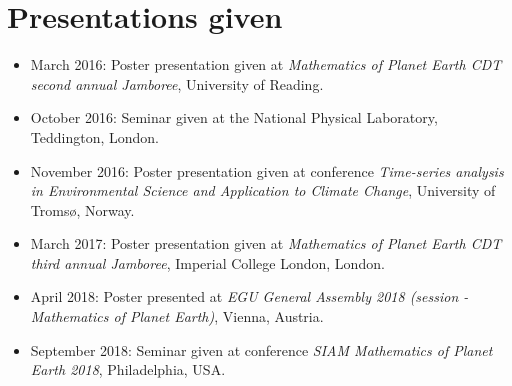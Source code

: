 \documentclass[a4paper,12pt,times,custombib, print]{PhDThesisPSnPDF}
\begin{document}
\chapter*{\centering \Large  Presentations given}
\begin{itemize}
	\item March 2016: Poster presentation given at \emph{Mathematics of Planet Earth CDT second annual Jamboree}, University of Reading.
	\item October 2016: Seminar given at the National Physical Laboratory, Teddington, London.
	\item November 2016: Poster presentation given at conference \emph{Time-series analysis in Environmental Science and Application to Climate Change}, University of Troms{\o}, Norway.
	\item March 2017: Poster presentation given at \emph{Mathematics of Planet Earth CDT third annual Jamboree}, Imperial College London, London.
	\item April 2018: Poster presented at \emph{EGU General Assembly 2018 (session - Mathematics of Planet Earth)}, Vienna, Austria.
	\item September 2018: Seminar given at conference \emph{SIAM Mathematics of Planet Earth 2018}, Philadelphia, USA.
\end{itemize}



\tableofcontents
\end{document}
